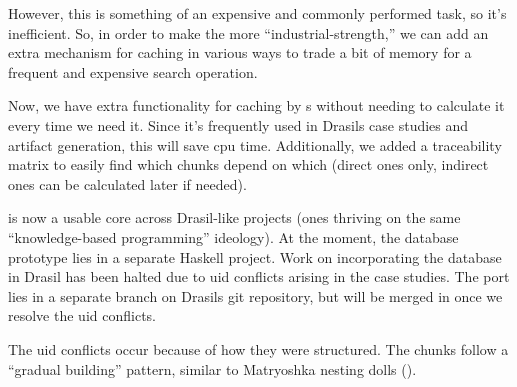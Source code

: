However, this is something of an expensive and commonly performed task, so it's
inefficient. So, in order to make the \ChunkDB{} more ``industrial-strength,''
we can add an extra mechanism for caching in various ways to trade a bit of
memory for a frequent and expensive search operation.


Now, we have extra functionality for caching by \TypeRep{}s without needing to
calculate it every time we need it. Since it's frequently used in Drasils case
studies and artifact generation, this will save \acs{cpu} time. Additionally, we
added a traceability matrix to easily find which chunks depend on which (direct
ones only, indirect ones can be calculated later if needed).

\ChunkDB{} is now a usable core across Drasil-like projects (ones thriving on
the same ``knowledge-based programming'' ideology). At the moment, the database
prototype lies in a separate Haskell project. Work on incorporating the database
in Drasil has been halted due to \acs{uid} conflicts arising in the case
studies. The port lies in a separate branch on Drasils git repository, but will
be merged in once we resolve the \acs{uid} conflicts.

\matryoshkaDollsImg{}

The \acs{uid} conflicts occur because of how they were structured. The chunks
follow a ``gradual building'' pattern, similar to Matryoshka nesting
dolls ().




